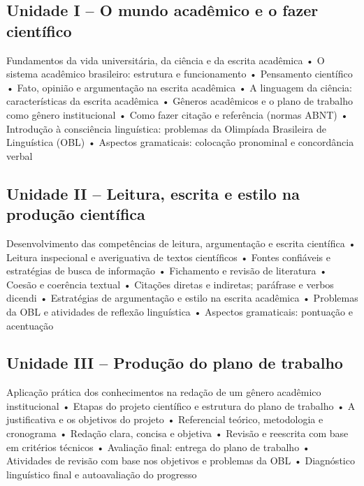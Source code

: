 \documentclass[
  letterpaper,
  DIV=11,
  numbers=noendperiod]{scrreprt}
\begin{document}
\subsection{Unidade I -- O mundo acadêmico e o fazer
científico}\label{unidade-i-o-mundo-acaduxeamico-e-o-fazer-cientuxedfico}

Fundamentos da vida universitária, da ciência e da escrita acadêmica • O
sistema acadêmico brasileiro: estrutura e funcionamento • Pensamento
científico • Fato, opinião e argumentação na escrita acadêmica • A
linguagem da ciência: características da escrita acadêmica • Gêneros
acadêmicos e o plano de trabalho como gênero institucional • Como fazer
citação e referência (normas ABNT) • Introdução à consciência
linguística: problemas da Olimpíada Brasileira de Linguística (OBL) •
Aspectos gramaticais: colocação pronominal e concordância verbal

\subsection{Unidade II -- Leitura, escrita e estilo na produção
científica}\label{unidade-ii-leitura-escrita-e-estilo-na-produuxe7uxe3o-cientuxedfica}

Desenvolvimento das competências de leitura, argumentação e escrita
científica • Leitura inspecional e averiguativa de textos científicos •
Fontes confiáveis e estratégias de busca de informação • Fichamento e
revisão de literatura • Coesão e coerência textual • Citações diretas e
indiretas; paráfrase e verbos dicendi • Estratégias de argumentação e
estilo na escrita acadêmica • Problemas da OBL e atividades de reflexão
linguística • Aspectos gramaticais: pontuação e acentuação

\subsection{Unidade III -- Produção do plano de
trabalho}\label{unidade-iii-produuxe7uxe3o-do-plano-de-trabalho}

Aplicação prática dos conhecimentos na redação de um gênero acadêmico
institucional • Etapas do projeto científico e estrutura do plano de
trabalho • A justificativa e os objetivos do projeto • Referencial
teórico, metodologia e cronograma • Redação clara, concisa e objetiva •
Revisão e reescrita com base em critérios técnicos • Avaliação final:
entrega do plano de trabalho • Atividades de revisão com base nos
objetivos e problemas da OBL • Diagnóstico linguístico final e
autoavaliação do progresso
\end{document}
